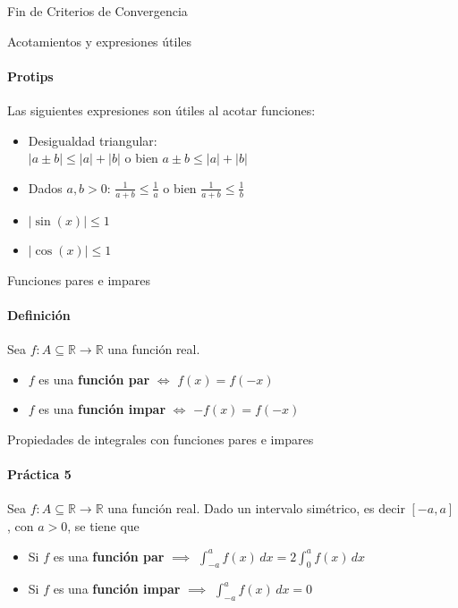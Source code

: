 \documentclass{plantillaPPT}
\begin{document}
\begin{frame}[plain]
\centering
\huge {}
Fin de Criterios de Convergencia
\end{frame}

\begin{frame}{Acotamientos y expresiones útiles}
\framesubtitle{Protips}

Las siguientes expresiones son útiles al acotar funciones:
\vspace{5pt}
\begin{itemize}
    \item Desigualdad triangular:\\
    \(|a\pm b| \leq |a|+|b|\) o bien \(a\pm b\leq|a|+|b|\)
    \vspace{5pt}
    \item Dados \(a,b>0\): \(\frac{1}{a+b}\leq\frac{1}{a}\) o bien \(\frac{1}{a+b}\leq\frac{1}{b}\)
    \vspace{5pt}
    \item \(|\sin(x)|\leq 1\)
    \item \(|\cos(x)|\leq 1\)
\end{itemize}
\end{frame}

\begin{frame}{Funciones pares e impares}
\framesubtitle{Definición}
Sea \(f:A\subseteq\mathbb{R}\to\mathbb{R}\) una función real.
\vspace{0.2cm}
\begin{itemize}
    \item \(f\) es una \textbf{función par} \(\iff\) \(f(x) = f(-x)\)
    \vspace{0.3cm}
    \item \(f\) es una \textbf{función impar} \(\iff\) \(-f(x) = f(-x)\)
\end{itemize}
\end{frame}

\begin{frame}{Propiedades de integrales con funciones pares e impares}
\framesubtitle{Práctica 5}

Sea \(f:A\subseteq\mathbb{R}\to\mathbb{R}\) una función real. Dado un intervalo simétrico, es decir \([-a, a]\), con \(a>0\), se tiene que
\vspace{0.5cm}
\begin{itemize}
    \item Si \(f\) es una \textbf{función par} \(\implies\) \(\displaystyle\int_{-a}^af(x)\,dx = 2\int_0^af(x)\,dx\)
    \vspace{0.5cm}
    \item Si \(f\) es una \textbf{función impar} \(\implies\) \(\displaystyle\int_{-a}^af(x)\,dx = 0\)
\end{itemize}
    
\end{frame}
\end{document}
